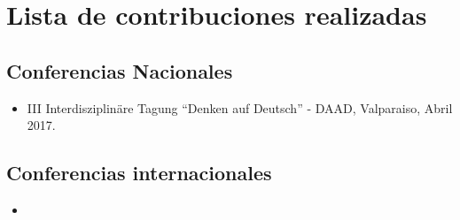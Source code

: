 \section{Lista de contribuciones realizadas}
\begin{spacing}{1.5}
\subsection*{Conferencias Nacionales}
\begin{itemize}
	\item III Interdisziplinäre Tagung “Denken auf Deutsch” - DAAD, Valparaiso, Abril 2017.
\end{itemize}

\subsection*{Conferencias internacionales}
\begin{itemize}
	\item 
\end{itemize}
\end{spacing}